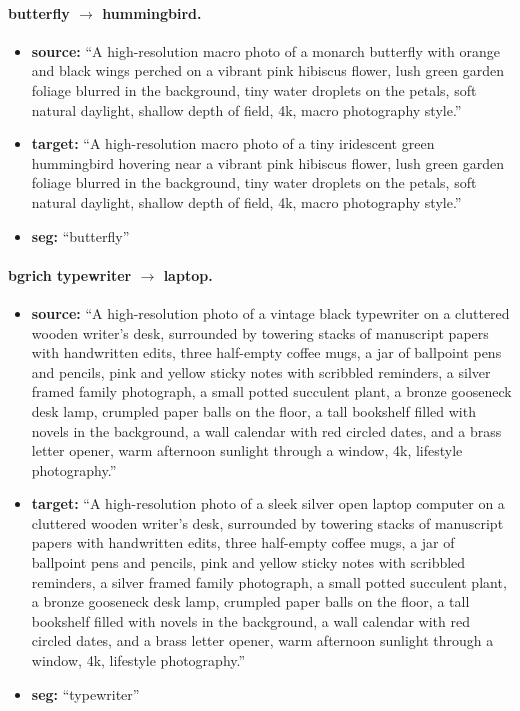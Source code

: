 \paragraph{butterfly $\to$ hummingbird.}
\begin{itemize}
    \item \textbf{source:} ``A high-resolution macro photo of a monarch butterfly with orange and black wings perched on a vibrant pink hibiscus flower, lush green garden foliage blurred in the background, tiny water droplets on the petals, soft natural daylight, shallow depth of field, 4k, macro photography style.''
    \item \textbf{target:} ``A high-resolution macro photo of a tiny iridescent green hummingbird hovering near a vibrant pink hibiscus flower, lush green garden foliage blurred in the background, tiny water droplets on the petals, soft natural daylight, shallow depth of field, 4k, macro photography style.''
    \item \textbf{seg:} ``butterfly''
\end{itemize}

\paragraph{bgrich typewriter $\to$ laptop.}
\begin{itemize}
    \item \textbf{source:} ``A high-resolution photo of a vintage black typewriter on a cluttered wooden writer's desk, surrounded by towering stacks of manuscript papers with handwritten edits, three half-empty coffee mugs, a jar of ballpoint pens and pencils, pink and yellow sticky notes with scribbled reminders, a silver framed family photograph, a small potted succulent plant, a bronze gooseneck desk lamp, crumpled paper balls on the floor, a tall bookshelf filled with novels in the background, a wall calendar with red circled dates, and a brass letter opener, warm afternoon sunlight through a window, 4k, lifestyle photography.''
    \item \textbf{target:} ``A high-resolution photo of a sleek silver open laptop computer on a cluttered wooden writer's desk, surrounded by towering stacks of manuscript papers with handwritten edits, three half-empty coffee mugs, a jar of ballpoint pens and pencils, pink and yellow sticky notes with scribbled reminders, a silver framed family photograph, a small potted succulent plant, a bronze gooseneck desk lamp, crumpled paper balls on the floor, a tall bookshelf filled with novels in the background, a wall calendar with red circled dates, and a brass letter opener, warm afternoon sunlight through a window, 4k, lifestyle photography.''
    \item \textbf{seg:} ``typewriter''
\end{itemize}

